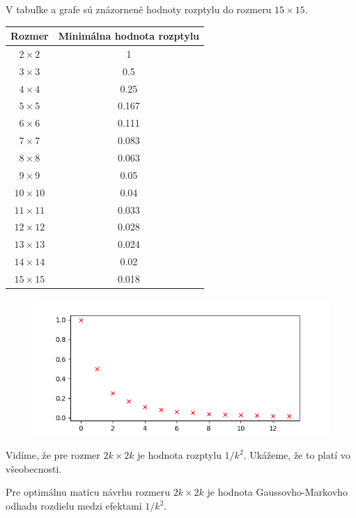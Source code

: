 V tabuľke a grafe sú znázornené hodnoty rozptylu do rozmeru $15 \times 15$.

\begin{center}
\begin{tabular}{ |c|c|}
  \hline
  Rozmer & Minimálna hodnota rozptylu \\ \hline
  $2 \times 2$ & 1 \\ \hline
  $3 \times 3$ & 0.5 \\ \hline
  $4 \times 4$ & 0.25 \\ \hline
  $5 \times 5$ & 0.167 \\ \hline
  $6 \times 6$ & 0.111 \\ \hline
  $7 \times 7$ & 0.083 \\ \hline
  $8 \times 8$ & 0.063 \\ \hline
  $9 \times 9$ & 0.05 \\ \hline
  $10 \times 10$ & 0.04 \\ \hline
  $11 \times 11$ & 0.033 \\ \hline
  $12 \times 12$ & 0.028 \\ \hline
  $13 \times 13$ & 0.024 \\ \hline
  $14 \times 14$ & 0.02 \\ \hline
  $15 \times 15$ & 0.018 \\ \hline
\end{tabular}
\end{center}

\begin{figure}[!h]
  \centering
  \includegraphics{minimalny_rozptyl.png}
\end{figure}

Vidíme, že pre rozmer $2k \times 2k$ je hodnota rozptylu $1/k^2$. Ukážeme, že to platí vo všeobecnosti.

\begin{prop}
Pre optimálnu maticu návrhu rozmeru $2k \times 2k$ je hodnota Gaussovho-Markovho odhadu rozdielu medzi efektami $1/k^2$.
\end{prop}

